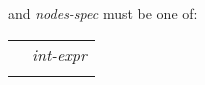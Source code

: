 
\vspace{0.3cm}


and {\it nodes-spec} must be one of:

\vspace{0.3cm}

\begin{tabular}{ll}
 \hspace{0.5cm} & {\it int-expr} \\
 \hspace{0.5cm} & {\tt *} \\
\end{tabular}

